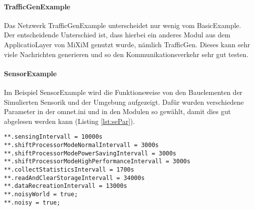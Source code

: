 \paragraph{TrafficGenExample}

Das Netzwerk TrafficGenExample unterscheidet nur wenig vom BasicExample. Der entscheidende Unterschied ist, dass hierbei ein anderes Modul aus dem ApplicatioLayer von MiXiM genutzt wurde, nämlich TrafficGen. Dieses kann sehr viele Nachrichten generieren und so den Kommunikationsverkehr sehr gut testen.

\paragraph{SensorExample}

Im Beispiel SensorExample wird die Funktionsweise von den Bauelementen der Simulierten Sensorik und der Umgebung aufgezeigt. Dafür wurden verschiedene Parameter in der omnet.ini und in den Modulen so gewählt, damit dies gut abgelesen werden kann (Listing \ref{lst:sePar}).\\

\begin{lstlisting}[language=ned,caption={Parameter für das Beispiel SensorExample},label=lst:sePar]
**.sensingIntervall = 10000s
**.shiftProcessorModeNormalIntervall = 3000s
**.shiftProcessorModePowerSavingIntervall = 3000s
**.shiftProcessorModeHighPerformanceIntervall = 3000s
**.collectStatisticsIntervall = 1700s
**.readAndClearStorageIntervall = 34000s
**.dataRecreationIntervall = 13000s
**.noisyWorld = true;
**.noisy = true; 
\end{lstlisting}

